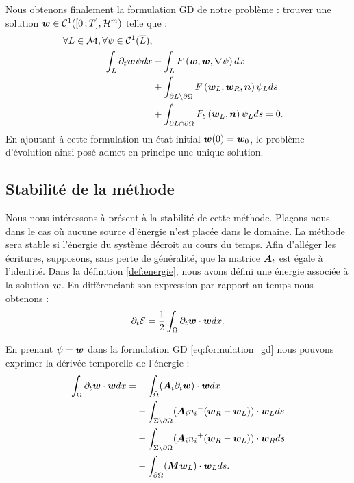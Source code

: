 Nous obtenons finalement la formulation GD de notre problème : trouver
une solution $\bm{w} \in \mathcal{C}^1(\lbrack0\,;T\rbrack,\mathcal{H}^m)$ telle que :
\begin{equation}
	\begin{aligned}
		\forall L \in \mathcal{M}, \forall \psi \in \mathcal{C}^1(\overline{L}), \\
		\int_{L} \partial_{t} \bm{w} \psi dx
		&- \int_{L} F\left(\bm{w},\bm{w},\nabla \psi\right) dx \\
		&+ \int_{\partial L \setminus \partial\Omega}
			F\left(\bm{w}_L,\bm{w}_R,\bm{n}\right) \psi_L ds \\
		&+ \int_{\partial L \cap \partial\Omega}
			F_b\left(\bm{w}_L,\bm{n}\right) \psi_L ds = 0
		\label{eq:formulation_gd_finale} .
	\end{aligned}
\end{equation}
En ajoutant à cette formulation un état initial $\bm{w}(0) = \bm{w}_0$,
le problème d’évolution ainsi posé admet en principe une unique solution.
\\


\subsection{Stabilité de la méthode}
\label{ssect:stabilite_gd}

Nous nous intéressons à présent à la stabilité de cette méthode. Plaçons-nous dans
le cas où aucune source d’énergie n’est placée dans le domaine. La méthode sera stable
si l’énergie du système décroit au cours du temps. Afin d’alléger les écritures,
supposons, sans perte de généralité, que la matrice $\bm{A}_{t}$ est égale à l’identité.
Dans la définition \ref{def:energie}, nous avons défini une énergie associée
à la solution $\bm{w}$.
En différenciant son expression par rapport au temps nous obtenons :
\begin{align}
	\partial_{t} \mathcal{E} = \frac{1}{2} \int_{\Omega} \partial_{t} \bm{w} \cdot \bm{w} dx .
\end{align}

En prenant $\psi = \bm{w}$ dans la formulation GD \eqref{eq:formulation_gd} nous
pouvons exprimer la dérivée temporelle de l'énergie :
\begin{equation}
	\begin{aligned}
		\int_{\Omega} \partial_{t} \bm{w} \cdot \bm{w} dx =
		&- \int_{\tilde{\Omega}} ({\bm{A}_{i}\partial_{i}} \bm{w}) \cdot \bm{w} dx \\
		&- \int_{\Sigma \setminus \partial\Omega}
			({\bm{A}_{i}n_{i}}^{-} (\bm{w}_R - \bm{w}_L)) \cdot \bm{w}_L ds \\
		&- \int_{\Sigma \setminus \partial\Omega}
			({\bm{A}_{i}n_{i}}^{+} (\bm{w}_R - \bm{w}_L)) \cdot \bm{w}_R ds \\
		&- \int_{\partial\Omega} (\bm{M} \bm{w}_L) \cdot \bm{w}_L ds .
	\end{aligned}
\end{equation}

